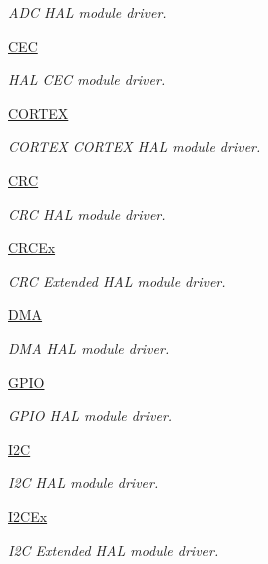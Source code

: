\begin{DoxyCompactItemize}
\begin{DoxyCompactList}\small\item\em A\+DC H\+AL module driver. \end{DoxyCompactList}\item 
\hyperlink{group___c_e_c}{C\+EC}
\begin{DoxyCompactList}\small\item\em H\+AL C\+EC module driver. \end{DoxyCompactList}\item 
\hyperlink{group___c_o_r_t_e_x}{C\+O\+R\+T\+EX}
\begin{DoxyCompactList}\small\item\em C\+O\+R\+T\+EX C\+O\+R\+T\+EX H\+AL module driver. \end{DoxyCompactList}\item 
\hyperlink{group___c_r_c}{C\+RC}
\begin{DoxyCompactList}\small\item\em C\+RC H\+AL module driver. \end{DoxyCompactList}\item 
\hyperlink{group___c_r_c_ex}{C\+R\+C\+Ex}
\begin{DoxyCompactList}\small\item\em C\+RC Extended H\+AL module driver. \end{DoxyCompactList}\item 
\hyperlink{group___d_m_a}{D\+MA}
\begin{DoxyCompactList}\small\item\em D\+MA H\+AL module driver. \end{DoxyCompactList}\item 
\hyperlink{group___g_p_i_o}{G\+P\+IO}
\begin{DoxyCompactList}\small\item\em G\+P\+IO H\+AL module driver. \end{DoxyCompactList}\item 
\hyperlink{group___i2_c}{I2C}
\begin{DoxyCompactList}\small\item\em I2C H\+AL module driver. \end{DoxyCompactList}\item 
\hyperlink{group___i2_c_ex}{I2\+C\+Ex}
\begin{DoxyCompactList}\small\item\em I2C Extended H\+AL module driver. \end{DoxyCompactList}\item 

\end{DoxyCompactItemize}
